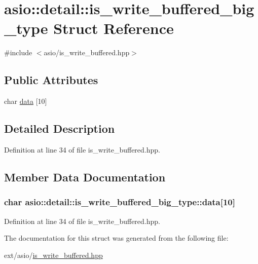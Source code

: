 \hypertarget{structasio_1_1detail_1_1is__write__buffered__big__type}{}\section{asio\+:\+:detail\+:\+:is\+\_\+write\+\_\+buffered\+\_\+big\+\_\+type Struct Reference}
\label{structasio_1_1detail_1_1is__write__buffered__big__type}


{\ttfamily \#include $<$asio/is\+\_\+write\+\_\+buffered.\+hpp$>$}

\subsection*{Public Attributes}
\begin{DoxyCompactItemize}
\item 
char \hyperlink{structasio_1_1detail_1_1is__write__buffered__big__type_aaf9d35127737f41251438e2aeebb9abd}{data} \mbox{[}10\mbox{]}
\end{DoxyCompactItemize}


\subsection{Detailed Description}


Definition at line 34 of file is\+\_\+write\+\_\+buffered.\+hpp.



\subsection{Member Data Documentation}
\hypertarget{structasio_1_1detail_1_1is__write__buffered__big__type_aaf9d35127737f41251438e2aeebb9abd}{}
\subsubsection[{data}]{\setlength{\rightskip}{0pt plus 5cm}char asio\+::detail\+::is\+\_\+write\+\_\+buffered\+\_\+big\+\_\+type\+::data\mbox{[}10\mbox{]}}\label{structasio_1_1detail_1_1is__write__buffered__big__type_aaf9d35127737f41251438e2aeebb9abd}


Definition at line 34 of file is\+\_\+write\+\_\+buffered.\+hpp.



The documentation for this struct was generated from the following file\+:\begin{DoxyCompactItemize}
\item 
ext/asio/\hyperlink{is__write__buffered_8hpp}{is\+\_\+write\+\_\+buffered.\+hpp}\end{DoxyCompactItemize}
